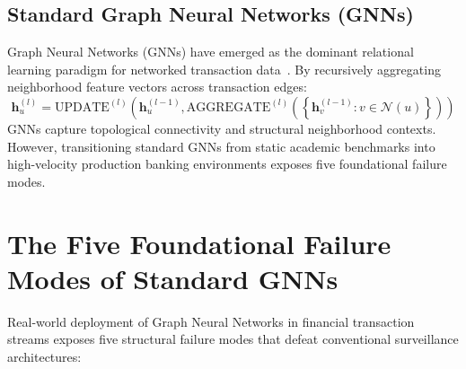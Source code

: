 \subsection{Standard Graph Neural Networks (GNNs)}
Graph Neural Networks (GNNs) have emerged as the dominant relational learning paradigm for networked transaction data~\cite{kipf2017semi, hamilton2017inductive, velickovic2018graph, brody2022how, hu2020heterogeneous, xu2019powerful}. By recursively aggregating neighborhood feature vectors across transaction edges:
\begin{equation}
\mathbf{h}_u^{(l)} = \text{UPDATE}^{(l)}\left( \mathbf{h}_u^{(l-1)}, \text{AGGREGATE}^{(l)}\left( \left\{ \mathbf{h}_v^{(l-1)} : v \in \mathcal{N}(u) \right\} \right) \right)
\end{equation}
GNNs capture topological connectivity and structural neighborhood contexts. However, transitioning standard GNNs from static academic benchmarks into high-velocity production banking environments exposes five foundational failure modes.

\section{The Five Foundational Failure Modes of Standard GNNs}
\label{sec:failure_modes}

Real-world deployment of Graph Neural Networks in financial transaction streams exposes five structural failure modes that defeat conventional surveillance architectures:

